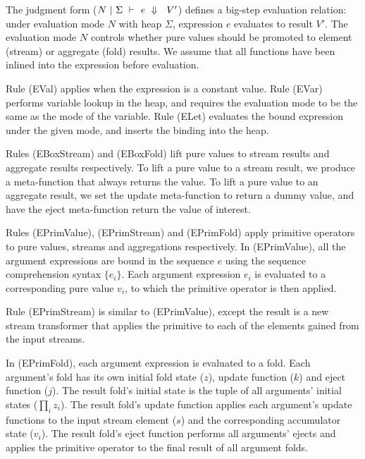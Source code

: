 The judgment form ($N~|~\Sigma~\vdash~e~\Downarrow~~V'$) defines a big-step evaluation relation: under evaluation mode $N$ with heap $\Sigma$, expression $e$ evaluates to result $V'$.
The evaluation mode $N$ controls whether pure values should be promoted to element (stream) or aggregate (fold) results. 
We assume that all functions have been inlined into the expression before evaluation.

Rule (EVal) applies when the expression is a constant value.
Rule (EVar) performs variable lookup in the heap, and requires the evaluation mode to be the same as the mode of the variable.
Rule (ELet) evaluates the bound expression under the given mode, and inserts the binding into the heap.



Rules (EBoxStream) and (EBoxFold) lift pure values to stream results and aggregate results respectively.
To lift a pure value to a stream result, we produce a meta-function that always returns the value.
To lift a pure value to an aggregate result, we set the update meta-function to return a dummy value, and have the eject meta-function return the value of interest.


Rules (EPrimValue), (EPrimStream) and (EPrimFold) apply primitive operators to pure values, streams and aggregations respectively.
In (EPrimValue), all the argument expressions are bound in the sequence $e$ using the sequence comprehension syntax $\{e_i\}$.
Each argument expression $e_i$ is evaluated to a corresponding pure value $v_i$, to which the primitive operator is then applied.

Rule (EPrimStream) is similar to (EPrimValue), except the result is a new stream transformer that applies the primitive to each of the elements gained from the input streams.

In (EPrimFold), each argument expression is evaluated to a fold.
Each argument's fold has its own initial fold state ($z$), update function ($k$) and eject function ($j$).
The result fold's initial state is the tuple of all arguments' initial states ($\prod_i z_i$).
The result fold's update function applies each argument's update functions to the input stream element ($s$) and the corresponding accumulator state ($v_i$).
The result fold's eject function performs all arguments' ejects and applies the primitive operator to the final result of all argument folds.

